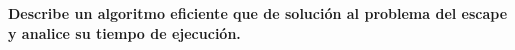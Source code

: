 \textbf{
    Describe un algoritmo eficiente que de solución al problema del escape y analice su tiempo
    de ejecución.
}\vspace{.2cm}
\textcolor{bibi}{}
\begin{quote}
\end{quote}
